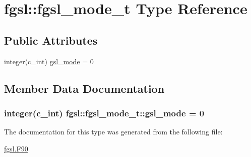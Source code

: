 \hypertarget{structfgsl_1_1fgsl__mode__t}{}\section{fgsl\+:\+:fgsl\+\_\+mode\+\_\+t Type Reference}
\label{structfgsl_1_1fgsl__mode__t}
\subsection*{Public Attributes}
\begin{DoxyCompactItemize}
\item 
integer(c\+\_\+int) \hyperlink{structfgsl_1_1fgsl__mode__t_a97ca5f06a2af8316f03d3d0247d77e6d}{gsl\+\_\+mode} = 0
\end{DoxyCompactItemize}


\subsection{Member Data Documentation}
\hypertarget{structfgsl_1_1fgsl__mode__t_a97ca5f06a2af8316f03d3d0247d77e6d}{}
\subsubsection[{gsl\+\_\+mode}]{\setlength{\rightskip}{0pt plus 5cm}integer(c\+\_\+int) fgsl\+::fgsl\+\_\+mode\+\_\+t\+::gsl\+\_\+mode = 0}\label{structfgsl_1_1fgsl__mode__t_a97ca5f06a2af8316f03d3d0247d77e6d}


The documentation for this type was generated from the following file\+:\begin{DoxyCompactItemize}
\item 
\hyperlink{fgsl_8F90}{fgsl.\+F90}\end{DoxyCompactItemize}
